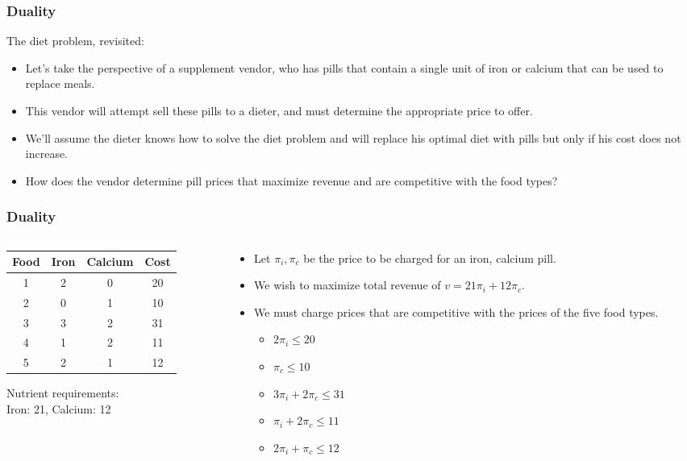\documentclass[12pt,handout]{beamer}
\begin{document}
\begin{frame}
\frametitle{Duality}
The diet problem, revisited:
\begin{itemize}
\item Let's take the perspective of a supplement vendor, who has pills that contain a single unit of iron or calcium that can be used to replace meals. 
\item This vendor will attempt sell these pills to a dieter, and must determine the appropriate price to offer. 
\item We'll assume the dieter knows how to solve the diet problem and will replace his optimal diet with pills but only if his cost does not increase.
\item How does the vendor determine pill prices that maximize revenue and are competitive with the food types?
\end{itemize}
\end{frame}

\begin{frame}
\frametitle{Duality}
\begin{columns}[t]
\begin{column}{4cm}
\begin{center}
\begin{tabular} {c | c | c | c}
Food & Iron & Calcium & Cost \\
\hline
1 & 2 & 0 & 20 \\
2 & 0 & 1 & 10 \\
3 & 3 & 2 & 31 \\
4 & 1 & 2 & 11 \\
5 & 2 & 1 & 12 \\
\end{tabular}
\end{center}
Nutrient requirements: \\ Iron: 21, Calcium: 12
\end{column}
\begin{column}{6cm}
\begin{itemize}
\item Let $\pi_i, \pi_c$ be the price to be charged for an iron, calcium pill.
\item We wish to maximize total revenue of $v = 21 \pi_i + 12 \pi_c$.
\item We must charge prices that are competitive with the prices of the five food types.
    \begin{itemize}
    \item $2\pi_i \le 20$
    \item $\pi_c \le 10$
    \item $3\pi_i + 2\pi_c \le 31$
    \item $\pi_i + 2\pi_c \le 11$
    \item $2\pi_i + \pi_c \le 12$
    \end{itemize}
\end{itemize}
\end{column}
\end{columns}
\end{frame}
\end{document}
